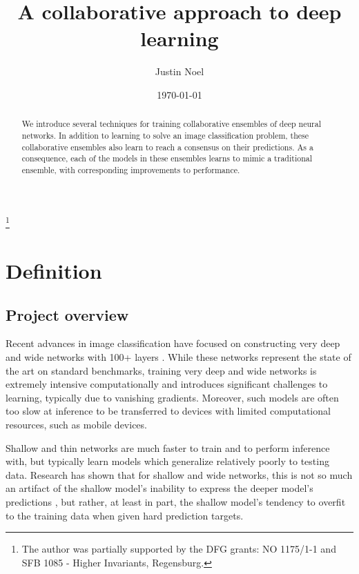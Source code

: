 \documentclass[english,a4paper,oneside]{amsart}
\theoremstyle{definition}
\begin{document}
	\title{A collaborative approach to deep learning}

	\author{Justin Noel}
	\address{University of Regensburg\\
	NWF I - Mathematik; Regensburg, Germany}
	 \thanks{The author was partially supported by the DFG grants: NO 1175/1-1 and SFB 1085 - Higher Invariants, Regensburg. }


\date{\today}

\begin{abstract}
	We introduce several techniques for training collaborative ensembles of deep neural networks. In addition to learning to solve an image classification problem, these collaborative ensembles also learn to reach a consensus on their predictions. As a consequence, each of the models in these ensembles learns to mimic a traditional ensemble, with corresponding improvements to performance. %
\end{abstract}

\maketitle
 
\tableofcontents

\section{Definition}
\subsection{Project overview}
Recent advances in image classification have focused on constructing very deep and wide networks with 100+ layers \cite{ResNet,Inception}. While these networks represent the state of the art on standard benchmarks, training very deep and wide networks is extremely intensive computationally and introduces significant challenges to learning, typically due to vanishing gradients. Moreover, such models are often too slow at inference to be transferred to devices with limited computational resources, such as mobile devices. 

Shallow and thin networks are much faster to train and to perform inference with, but typically learn models which generalize relatively poorly to testing data. Research has shown that for shallow and wide networks, this is not so much an artifact of the shallow model's inability to express the deeper model's predictions \cite{Distillation,Shallow,Compression}, but rather, at least in part, the shallow model's tendency to overfit to the training data when given hard prediction targets. 
\end{document}
